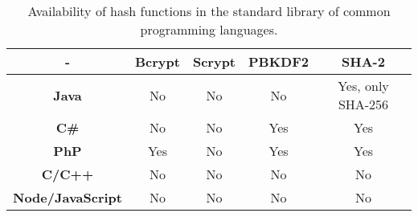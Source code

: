 	\begin{table}[h!]
		\begin{center}
			\begin{tabular}{|c|c|c|c|c|}
				\hline
				- & \textbf{Bcrypt} & \textbf{Scrypt} & \textbf{PBKDF2} & \textbf{SHA-2}\\\hline
				\textbf{Java} & No & No & No & Yes, only SHA-256 \\\hline
				\textbf{C\#} & No & No & Yes & Yes \\\hline
				\textbf{PhP} & Yes & No & Yes & Yes \\\hline
				\textbf{C/C++} & No & No & No & No \\\hline
				\textbf{Node/JavaScript} & No & No & No & No \\\hline
			\end{tabular}
			\caption{Availability of hash functions in the standard library of common programming languages. }
			\label{tab:table1}
		\end{center}
	\end{table}
